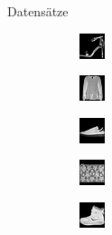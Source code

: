 \documentclass[aspectratio=169, 12pt]{beamer}
\begin{document}
\begin{frame}{Datensätze}
\begin{figure}
\begin{subfigure}{1.4cm}
    \end{subfigure}
    \par\bigskip
    \begin{subfigure}{1.4cm}
        \centering
        \includegraphics{images/datasets/fashionmnist/fashion_mnist_5_0.png}
    \end{subfigure}
    \begin{subfigure}{1.4cm}
        \centering
        \includegraphics{images/datasets/fashionmnist/fashion_mnist_6_0.png}
    \end{subfigure}
    \begin{subfigure}{1.4cm}
        \centering
        \includegraphics{images/datasets/fashionmnist/fashion_mnist_7_0.png}
    \end{subfigure}
    \begin{subfigure}{1.4cm}
        \centering
        \includegraphics{images/datasets/fashionmnist/fashion_mnist_8_0.png}
    \end{subfigure}
    \begin{subfigure}{1.4cm}
        \centering
        \includegraphics{images/datasets/fashionmnist/fashion_mnist_9_0.png}
    \end{subfigure}
  \end{figure}
\end{frame}
\end{document}
